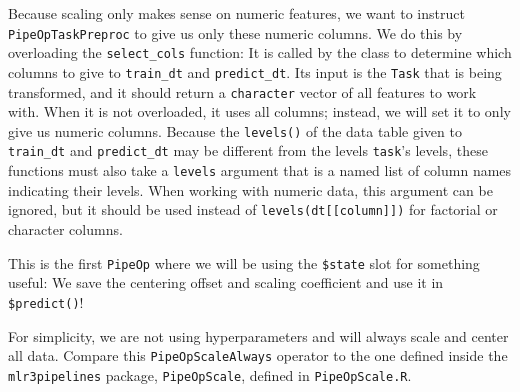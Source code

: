 \documentclass[]{scrbook}
\begin{document}
Because scaling only makes sense on numeric features, we want to instruct \texttt{PipeOpTaskPreproc} to give us only these numeric columns.
We do this by overloading the \texttt{select\_cols} function: It is called by the class to determine which columns to give to \texttt{train\_dt} and \texttt{predict\_dt}.
Its input is the \texttt{Task} that is being transformed, and it should return a \texttt{character} vector of all features to work with.
When it is not overloaded, it uses all columns; instead, we will set it to only give us numeric columns.
Because the \texttt{levels()} of the data table given to \texttt{train\_dt} and \texttt{predict\_dt} may be different from the levels \texttt{task}'s levels, these functions must also take a \texttt{levels} argument that is a named list of column names indicating their levels.
When working with numeric data, this argument can be ignored, but it should be used instead of \texttt{levels(dt{[}{[}column{]}{]})} for factorial or character columns.

This is the first \texttt{PipeOp} where we will be using the \texttt{\$state} slot for something useful: We save the centering offset and scaling coefficient and use it in \texttt{\$predict()}!

For simplicity, we are not using hyperparameters and will always scale and center all data.
Compare this \texttt{PipeOpScaleAlways} operator to the one defined inside the \texttt{mlr3pipelines} package, \texttt{PipeOpScale}, defined in \texttt{PipeOpScale.R}.
\end{document}
